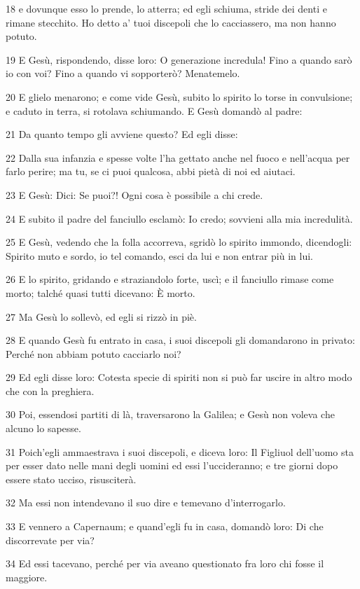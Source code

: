 \par 18 e dovunque esso lo prende, lo atterra; ed egli schiuma, stride dei denti e rimane stecchito. Ho detto a' tuoi discepoli che lo cacciassero, ma non hanno potuto.
\par 19 E Gesù, rispondendo, disse loro: O generazione incredula! Fino a quando sarò io con voi? Fino a quando vi sopporterò? Menatemelo.
\par 20 E glielo menarono; e come vide Gesù, subito lo spirito lo torse in convulsione; e caduto in terra, si rotolava schiumando. E Gesù domandò al padre:
\par 21 Da quanto tempo gli avviene questo? Ed egli disse:
\par 22 Dalla sua infanzia e spesse volte l'ha gettato anche nel fuoco e nell'acqua per farlo perire; ma tu, se ci puoi qualcosa, abbi pietà di noi ed aiutaci.
\par 23 E Gesù: Dici: Se puoi?! Ogni cosa è possibile a chi crede.
\par 24 E subito il padre del fanciullo esclamò: Io credo; sovvieni alla mia incredulità.
\par 25 E Gesù, vedendo che la folla accorreva, sgridò lo spirito immondo, dicendogli: Spirito muto e sordo, io tel comando, esci da lui e non entrar più in lui.
\par 26 E lo spirito, gridando e straziandolo forte, uscì; e il fanciullo rimase come morto; talché quasi tutti dicevano: È morto.
\par 27 Ma Gesù lo sollevò, ed egli si rizzò in piè.
\par 28 E quando Gesù fu entrato in casa, i suoi discepoli gli domandarono in privato: Perché non abbiam potuto cacciarlo noi?
\par 29 Ed egli disse loro: Cotesta specie di spiriti non si può far uscire in altro modo che con la preghiera.
\par 30 Poi, essendosi partiti di là, traversarono la Galilea; e Gesù non voleva che alcuno lo sapesse.
\par 31 Poich'egli ammaestrava i suoi discepoli, e diceva loro: Il Figliuol dell'uomo sta per esser dato nelle mani degli uomini ed essi l'uccideranno; e tre giorni dopo essere stato ucciso, risusciterà.
\par 32 Ma essi non intendevano il suo dire e temevano d'interrogarlo.
\par 33 E vennero a Capernaum; e quand'egli fu in casa, domandò loro: Di che discorrevate per via?
\par 34 Ed essi tacevano, perché per via aveano questionato fra loro chi fosse il maggiore.
